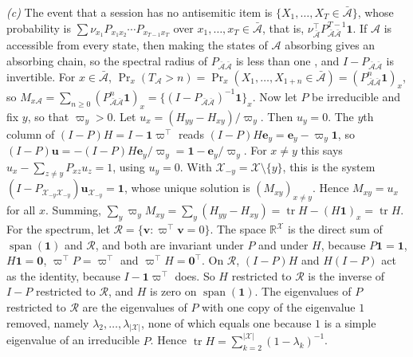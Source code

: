\emph{(c)} The event that a session has no antisemitic item is $\{X_1,\dots,X_T\in\bar{\mathcal A}\}$, whose probability is $\sum\nu_{x_1}P_{x_1x_2}\cdots P_{x_{T-1}x_T}$ over $x_1,\dots,x_T\in\bar{\mathcal A}$, that is, $\nu_{\bar{\mathcal A}}^{\top}P_{\bar{\mathcal A}\bar{\mathcal A}}^{T-1}\bm1$. If $\mathcal A$ is accessible from every state, then making the states of $\mathcal A$ absorbing gives an absorbing chain, so the spectral radius of $P_{\bar{\mathcal A}\bar{\mathcal A}}$ is less than one \citep[Ch.~3]{kemeny1960}, and $I-P_{\bar{\mathcal A}\bar{\mathcal A}}$ is invertible. For $x\in\bar{\mathcal A}$, $\Pr_x(T_{\mathcal A}>n)=\Pr_x(X_1,\dots,X_{1+n}\in\bar{\mathcal A})=(P_{\bar{\mathcal A}\bar{\mathcal A}}^{n}\bm1)_x$, so $M_{x\mathcal A}=\sum_{n\ge0}(P_{\bar{\mathcal A}\bar{\mathcal A}}^n\bm1)_x=\{(I-P_{\bar{\mathcal A}\bar{\mathcal A}})^{-1}\bm1\}_x$.
Now let $P$ be irreducible and fix $y$, so that $\varpi_y>0$. Let $u_x=(H_{yy}-H_{xy})/\varpi_y$. Then $u_y=0$. The $y$th column of $(I-P)H=I-\bm1\varpi^{\top}$ reads $(I-P)H\bm e_y=\bm e_y-\varpi_y\bm1$, so $(I-P)\bm u=-(I-P)H\bm e_y/\varpi_y=\bm1-\bm e_y/\varpi_y$. For $x\neq y$ this says $u_x-\sum_{z\neq y}P_{xz}u_z=1$, using $u_y=0$. With $\mathcal X_{-y}=\mathcal X\setminus\{y\}$, this is the system $(I-P_{\mathcal X_{-y}\mathcal X_{-y}})\bm u_{\mathcal X_{-y}}=\bm1$, whose unique solution is $(M_{xy})_{x\neq y}$. Hence $M_{xy}=u_x$ for all $x$. Summing, $\sum_y\varpi_yM_{xy}=\sum_y(H_{yy}-H_{xy})=\operatorname{tr}H-(H\bm1)_x=\operatorname{tr}H$.
For the spectrum, let $\mathcal R=\{\bm v:\varpi^{\top}\bm v=0\}$. The space $\mathbb R^{\mathcal X}$ is the direct sum of $\operatorname{span}(\bm1)$ and $\mathcal R$, and both are invariant under $P$ and under $H$, because $P\bm1=\bm1$, $H\bm1=\bm0$, $\varpi^{\top}P=\varpi^{\top}$ and $\varpi^{\top}H=\bm0^{\top}$. On $\mathcal R$, $(I-P)H$ and $H(I-P)$ act as the identity, because $I-\bm1\varpi^{\top}$ does. So $H$ restricted to $\mathcal R$ is the inverse of $I-P$ restricted to $\mathcal R$, and $H$ is zero on $\operatorname{span}(\bm1)$. The eigenvalues of $P$ restricted to $\mathcal R$ are the eigenvalues of $P$ with one copy of the eigenvalue $1$ removed, namely $\lambda_2,\dots,\lambda_{|\mathcal X|}$, none of which equals one because $1$ is a simple eigenvalue of an irreducible $P$. Hence $\operatorname{tr}H=\sum_{k=2}^{|\mathcal X|}(1-\lambda_k)^{-1}$.

